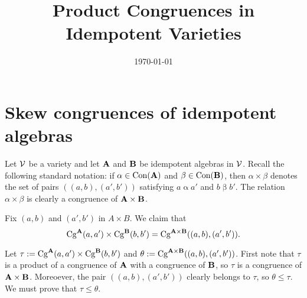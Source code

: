 



\usepackage{inputs/macros}



\title[Product Congruences]{Product Congruences in Idempotent Varieties}
\date{\today}
\address{University of Hawaii}


\maketitle


\section{Skew congruences of idempotent algebras}
Let $\mathcal{V}$ be a variety and let $\mathbf{A}$ and $\mathbf{B}$ be idempotent
algebras in $\mathcal{V}$.
Recall the following standard notation:
if $\alpha \in \operatorname{Con}(\mathbf{A})$ and $\beta \in \operatorname{Con}(\mathbf{B})$, then
$\alpha \times \beta$ denotes the set of pairs $((a,b),(a',b'))$ satisfying
$a \mathrel{\alpha} a'$ and $b \mathrel{\beta} b'$.  The relation 
$\alpha \times \beta$ is clearly a congruence of $\mathbf{A} \times \mathbf{B}$.

Fix $(a, b)$ and $(a', b')$ in $A \times B$.
We claim that
\[\operatorname{Cg}^{\mathbf{A}}(a,a') \times \operatorname{Cg}^{\mathbf{B}}(b,b')
=\operatorname{Cg}^{\mathbf{A} \times \mathbf{B}}((a, b), (a', b')).\]

Let $\tau := \operatorname{Cg}^{\mathbf{A}}(a,a') \times \operatorname{Cg}^{\mathbf{B}}(b,b')$  %
and $\theta:= \operatorname{Cg}^{\mathbf{A} \times \mathbf{B}}((a, b), (a', b'))$.
First note that $\tau$ is a product of a congruence
of $\mathbf{A}$ with a congruence of $\mathbf{B}$, so $\tau$
is a congruence of $\mathbf{A}\times \mathbf{B}$.
Moreoever, the pair $((a,b), (a',b'))$ clearly belongs to $\tau$, so
$\theta\leq \tau$.  We must prove that $\tau \leq \theta$.

